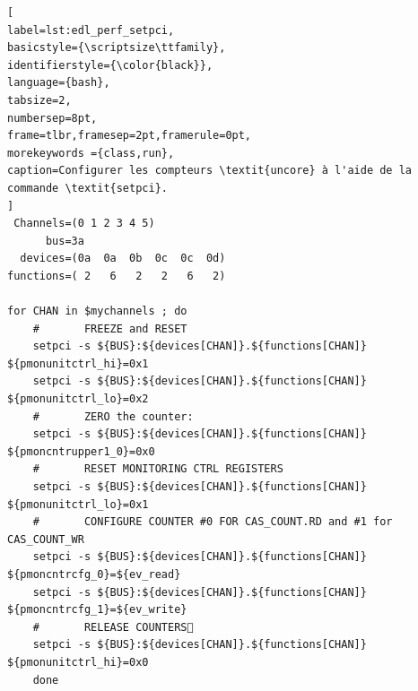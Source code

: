 \begin{minipage}{\linewidth}
\begin{lstlisting}[
label=lst:edl_perf_setpci,
basicstyle={\scriptsize\ttfamily},
identifierstyle={\color{black}},
language={bash},
tabsize=2,
numbersep=8pt,
frame=tlbr,framesep=2pt,framerule=0pt,
morekeywords ={class,run},
caption=Configurer les compteurs \textit{uncore} à l'aide de la commande \textit{setpci}.
]
 Channels=(0 1 2 3 4 5)
      bus=3a
  devices=(0a  0a  0b  0c  0c  0d)
functions=( 2   6   2   2   6   2)

for CHAN in $mychannels ; do
    #       FREEZE and RESET
    setpci -s ${BUS}:${devices[CHAN]}.${functions[CHAN]} ${pmonunitctrl_hi}=0x1        
    setpci -s ${BUS}:${devices[CHAN]}.${functions[CHAN]} ${pmonunitctrl_lo}=0x2
    #       ZERO the counter:        
    setpci -s ${BUS}:${devices[CHAN]}.${functions[CHAN]} ${pmoncntrupper1_0}=0x0  
    #       RESET MONITORING CTRL REGISTERS        
    setpci -s ${BUS}:${devices[CHAN]}.${functions[CHAN]} ${pmonunitctrl_lo}=0x1
    #       CONFIGURE COUNTER #0 FOR CAS_COUNT.RD and #1 for CAS_COUNT_WR        
    setpci -s ${BUS}:${devices[CHAN]}.${functions[CHAN]} ${pmoncntrcfg_0}=${ev_read}        
    setpci -s ${BUS}:${devices[CHAN]}.${functions[CHAN]} ${pmoncntrcfg_1}=${ev_write}
    #       RELEASE COUNTERS        
    setpci -s ${BUS}:${devices[CHAN]}.${functions[CHAN]} ${pmonunitctrl_hi}=0x0
    done
\end{lstlisting}
\end{minipage}
    
    
    
    
